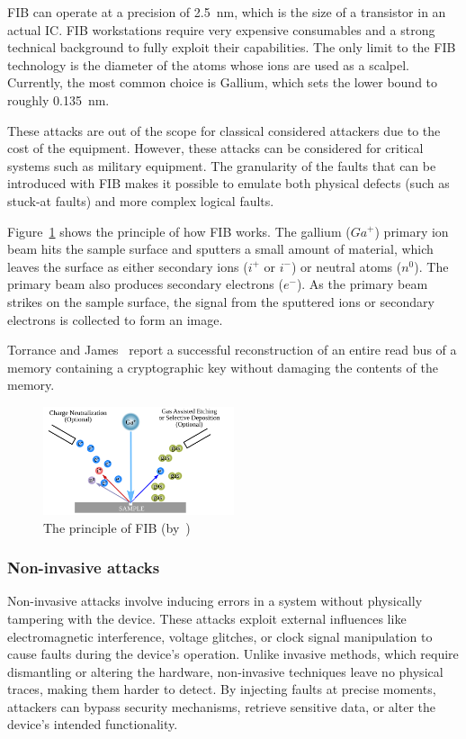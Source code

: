 FIB can operate at a precision of \SI{2.5}{\nano\metre}, which is the size of a transistor in an actual IC.
FIB workstations require very expensive consumables and a strong technical background to fully exploit their capabilities. The only limit to the FIB technology is the diameter of the atoms whose ions are used as a scalpel. Currently, the most common choice is Gallium, which sets the lower bound to roughly \SI{0.135}{\nano\metre}.

These attacks are out of the scope for classical considered attackers due to the cost of the equipment. However, these attacks can be considered for critical systems such as military equipment. The granularity of the faults that can be introduced with FIB makes it possible to emulate both physical defects (such as stuck-at faults) and more complex logical faults.

Figure~\ref{fig:fib_setup} shows the principle of how FIB works. The gallium ($Ga^+$) primary ion beam hits the sample surface and sputters a small amount of material, which leaves the surface as either secondary ions ($i^+$ or $i^-$) or neutral atoms ($n^0$). The primary beam also produces secondary electrons ($e^-$). As the primary beam strikes on the sample surface, the signal from the sputtered ions or secondary electrons is collected to form an image.

Torrance and James~\cite{TJ-09-ches} report a successful reconstruction of an entire read bus of a memory containing a cryptographic key without damaging the contents of the memory.

\begin{figure}[ht]
    \centering
    \includegraphics[width=0.5\textwidth]{c2_soa/img/fib.png}
    \caption{The principle of FIB (by~\cite{fib-24-wikipedia})}
    \label{fig:fib_setup}
\end{figure}

\subsubsection{Non-invasive attacks}
Non-invasive attacks involve inducing errors in a system without physically tampering with the device. These attacks exploit external influences like electromagnetic interference, voltage glitches, or clock signal manipulation to cause faults during the device's operation. Unlike invasive methods, which require dismantling or altering the hardware, non-invasive techniques leave no physical traces, making them harder to detect. By injecting faults at precise moments, attackers can bypass security mechanisms, retrieve sensitive data, or alter the device's intended functionality.

